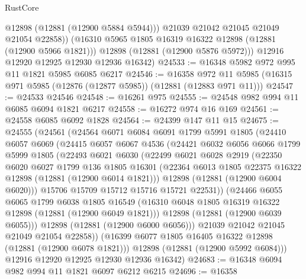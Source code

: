 \begin{lexlean}{RustCore}
\begin{coremodule}
              @12898
              (@12881 (@12900 @5884 @5944)))
            @21039
            @21042
            @21045
            @21049
            @21054
            @22858))
        (@16310 @5965 @1805 @16319 @16322 @12898 (@12881 (@12900 @5966 @1821)))
        @12898
        (@12881 (@12900 @5876 @5972)))
      @12916
      @12920
      @12925
      @12930
      @12936
      @16342)
@24533 := @16348 @5982 @972 @995 @11 @1821 @5985 @6085 @6217
@24546 := @16358
    @972
    @11
    @5985
    (@16315 @971 @5985 (@12876 (@12877 @5985)) (@12881 (@12883 @971 @11)))
@24547 := @24533 @24546
@24548 := @16261 @975
@24555 := @24548 @982 @994 @11 @6085 @6094 @1821 @6217
@24558 := @16272 @974 @16 @169
@24561 := @24558 @6085 @6092 @1828
@24564 := @24399 @147 @11 @15
@24675 := @24555
    (@24561
      (@24564
        @6071
        @6084
        @6091
        @1799
        @5991
        @1805
        (@24410
          @6057
          @6069
          (@24415
            @6057
            @6067
            @4536
            (@24421
              @6032
              @6056
              @6066
              @1799
              @5999
              @1805
              (@22493
                @6021
                @6030
                (@22499
                  @6021
                  @6028
                  @2919
                  (@22350
                    @6020
                    @6027
                    @1799
                    @136
                    @1805
                    @16301
                    (@22364 @6013 @1805 @22375 @16322 @12898 (@12881 (@12900 @6014 @1821)))
                    @12898
                    (@12881 (@12900 @6004 @6020)))
                  @15706
                  @15709
                  @15712
                  @15716
                  @15721
                  @22531))
              (@24466
                @6055
                @6065
                @1799
                @6038
                @1805
                @16549
                (@16310 @6048 @1805 @16319 @16322 @12898 (@12881 (@12900 @6049 @1821)))
                @12898
                (@12881 (@12900 @6039 @6055)))
              @12898
              (@12881 (@12900 @6000 @6056)))
            @21039
            @21042
            @21045
            @21049
            @21054
            @22858))
        (@16399 @6077 @1805 @16405 @16322 @12898 (@12881 (@12900 @6078 @1821)))
        @12898
        (@12881 (@12900 @5992 @6084)))
      @12916
      @12920
      @12925
      @12930
      @12936
      @16342)
@24683 := @16348 @6094 @982 @994 @11 @1821 @6097 @6212 @6215
@24696 := @16358

\end{coremodule}
\end{lexlean}
